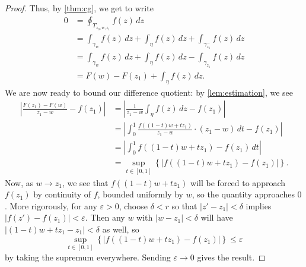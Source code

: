 \begin{proof}
	Thus, by \autoref{thm:cg}, we get to write
	\begin{align*}
		0 &= \oint_{T_{z_0,w,z_1}}f(z)\,dz \\
		&= \int_{\gamma_w}f(z)\,dz+\int_\eta f(z)\,dz+\int_{\gamma_{z_1}^-}f(z)\,dz \\
		&= \int_{\gamma_w}f(z)\,dz+\int_\eta f(z)\,dz-\int_{\gamma_{z_1}}f(z)\,dz \\
		&= F(w)-F(z_1)+\int_\eta f(z)\,dz.
	\end{align*}
	We are now ready to bound our difference quotient: by \autoref{lem:estimation}, we see
	\begin{align*}
		\left|\frac{F(z_1)-F(w)}{z_1-w}-f(z_1)\right| &= \left|\frac1{z_1-w}\int_\eta f(z)\,dz-f(z_1)\right| \\
		&= \left|\int_0^1\frac{f((1-t)w+tz_1)}{z_1-w}\cdot(z_1-w)\,dt-f(z_1)\right| \\
		&= \left|\int_0^1f((1-t)w+tz_1)-f(z_1)\,dt\right| \\
		&= \sup_{t\in[0,1]}\left\{\big|f((1-t)w+tz_1)-f(z_1)\big|\right\}.
	\end{align*}
	Now, as $w\to z_1$, we see that $f((1-t)w+tz_1)$ will be forced to approach $f(z_1)$ by continuity of $f$, bounded uniformly by $w$, so the quantity approaches $0$. More rigorously, for any $\varepsilon>0$, choose $\delta<r$ so that $|z'-z_1|<\delta$ implies $|f(z')-f(z_1)|<\varepsilon$. Then any $w$ with $|w-z_1|<\delta$ will have $|(1-t)w+tz_1-z_1|<\delta$ as well, so
	\[\sup_{t\in[0,1]}\left\{\big|f((1-t)w+tz_1)-f(z_1)\big|\right\}\le\varepsilon\]
	by taking the supremum everywhere. Sending $\varepsilon\to0$ gives the result.
\end{proof}